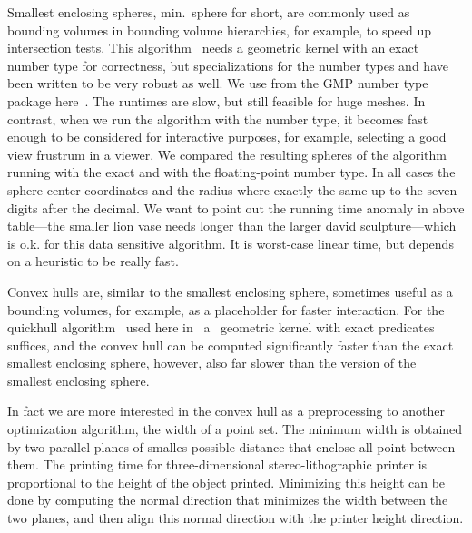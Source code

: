 Smallest enclosing spheres, min.~sphere for short, are commonly used
as bounding volumes in bounding volume hierarchies, for example, to
speed up intersection tests. This algorithm~\cite{fg-sebbc-03} needs a
geometric kernel with an exact number type for correctness, but
specializations for the number types  and
 have been written to be very robust as well. We use
 from the GMP number type package
here~\cite{cgal:g-gmpal-96}. The runtimes are slow, but still feasible
for huge meshes. In contrast, when we run the algorithm with the
 number type, it becomes fast enough to be considered
for interactive purposes, for example, selecting a good view frustrum
in a viewer. We compared the resulting spheres of the algorithm
running with the exact and with the floating-point number type. In all
cases the sphere center coordinates and the radius where exactly the
same up to the seven digits after the decimal. We want to point out
the running time anomaly in above table---the smaller lion vase needs
longer than the larger david sculpture---which is o.k. for this data
sensitive algorithm. It is worst-case linear time, but depends on a
heuristic to be really fast.




Convex hulls are, similar to the smallest enclosing sphere, sometimes
useful as a bounding volumes, for example, as a placeholder for faster
interaction. For the quickhull algorithm~\cite{bdh-qach-96} used here
in \cgal\ a \cgal\ geometric kernel with exact predicates suffices,
and the convex hull can be computed significantly faster than the
exact smallest enclosing sphere, however, also far slower than the
 version of the smallest enclosing sphere.

In fact we are more interested in the convex hull as a preprocessing
to another optimization algorithm, the width of a point set. The
minimum width is obtained by two parallel planes of smalles possible
distance that enclose all point between them. The printing time for
three-dimensional stereo-lithographic printer is proportional to the
height of the object printed. Minimizing this height can be done by
computing the normal direction that minimizes the width between the
two planes, and then align this normal direction with the printer
height direction.

